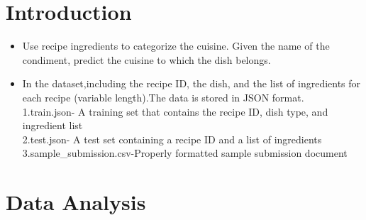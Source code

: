 \section{Introduction}
\label{sec-intro}
\begin{itemize}
   \item Use recipe ingredients to categorize the cuisine.
   Given the name of the condiment, predict the cuisine to which the dish belongs.
   \item In the dataset,including the recipe ID, the dish, and the list of ingredients for each recipe (variable length).The data is stored in JSON format. \\
   1.train.json- A training set that contains the recipe ID, dish type, and ingredient list\\
   2.test.json- A test set containing a recipe ID and a list of ingredients\\
   3.sample_submission.csv-Properly formatted sample submission document
\end{itemize} 
\section{Data Analysis} \label{sec-preliminaries}

